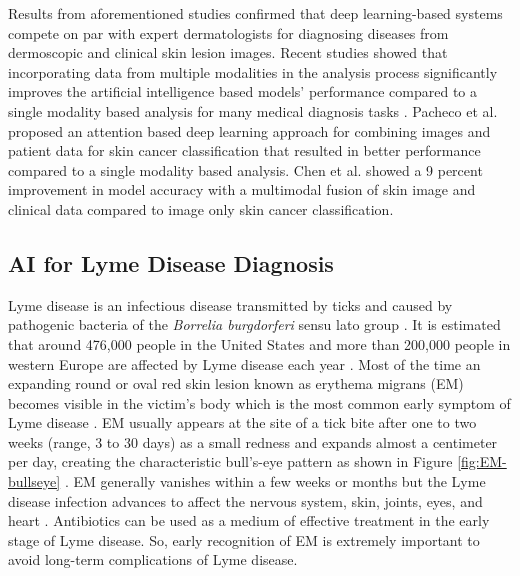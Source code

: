 Results from aforementioned studies confirmed that deep learning-based systems compete on par with expert dermatologists for diagnosing diseases from dermoscopic and clinical skin lesion images. Recent studies showed that incorporating data from multiple modalities in the analysis process significantly improves the artificial intelligence based models' performance compared to a single modality based analysis for many medical diagnosis tasks \cite{Senaratne10.1145/3556980, Li10.1145/3344256, Pacheco9364366, Chen2022}. Pacheco et al. \cite{Pacheco9364366} proposed an attention based deep learning approach for combining images and patient data for skin cancer classification that resulted in better performance compared to a single modality based analysis. Chen et al. \cite{Chen2022} showed a 9 percent improvement in model accuracy with a multimodal fusion of skin image and clinical data compared to image only skin cancer classification. 

\subsection{AI for Lyme Disease Diagnosis}
Lyme disease is an infectious disease transmitted by ticks and caused by pathogenic bacteria of the \textit{Borrelia burgdorferi} sensu lato group \cite{Shapiro2014}. It is estimated that around 476,000 people in the United States and more than 200,000 people in western Europe are affected by Lyme disease each year \cite{Marques2021}. Most of the time an expanding round or oval red skin lesion known as erythema migrans (EM) becomes visible in the victim’s body which is the most common early symptom of Lyme disease \cite{Shapiro2014, Burlina2018}. EM usually appears at the site of a tick bite after one to two weeks (range, 3 to 30 days) as a small redness and expands almost a centimeter per day, creating the characteristic bull’s-eye pattern as shown in Figure \ref{fig:EM-bullseye} \cite{Shapiro2014, Burlina2018, Strle2009, Berglund1995}. EM generally vanishes within a few weeks or months but the Lyme disease infection advances to affect the nervous system, skin, joints, eyes, and heart \cite{Shapiro2014, Strle2009}. Antibiotics can be used as a medium of effective treatment in the early stage of Lyme disease. So, early recognition of EM is extremely important to avoid long-term complications of Lyme disease. 

